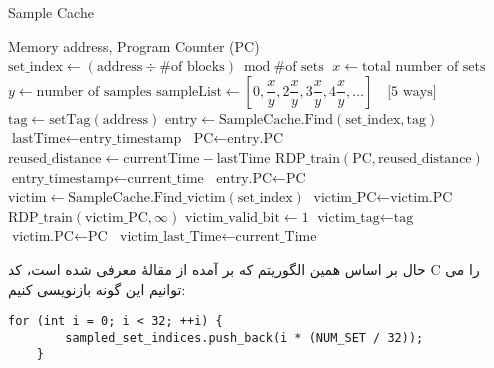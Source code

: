 \documentclass[17pt]{article}
\begin{document}
\begin{latin}
\begin{algorithm}
\caption{Sample Cache}\label{alg:sca}
\begin{algorithmic}[1]
\Require Memory address, Program Counter (PC)
\Statex
{}
    \State $\text{set\_index} \gets (\text{address} \div \text{\# of blocks}) \bmod \text{\# of sets}$
    \State $x \gets \text{total number of sets}$
    \State $y \gets \text{number of samples}$
    \State $\text{sampleList} \gets [0, \dfrac{x}{y}, 2\dfrac{x}{y}, 3\dfrac{x}{y}, 4\dfrac{x}{y}, \dots] \quad \text{[5 ways]}$
    \Statex
        \State $\text{tag} \gets \text{setTag}(\text{address})$
        \State $\text{entry} \gets \text{SampleCache.Find}(\text{set\_index}, \text{tag})$
            \State $\text{lastTime} \gets \text{entry\_timestamp}$
            \State $\text{PC} \gets \text{entry.PC}$
            \State $\text{reused\_distance} \gets \text{currentTime} - \text{lastTime}$
            \State $\text{RDP\_train}(\text{PC}, \text{reused\_distance})$
            \State $\text{entry\_timestamp} \gets \text{current\_time}$
            \State $\text{entry.PC} \gets \text{PC}$
        \Else
            \State $\text{victim} \gets \text{SampleCache.Find\_victim}(\text{set\_index})$
            \State $\text{victim\_PC} \gets \text{victim.PC}$
            \State $\text{RDP\_train}(\text{victim\_PC}, \infty)$ 
            \State $\text{victim\_valid\_bit} \gets 1$
            \State $\text{victim\_tag} \gets \text{tag}$
            \State $\text{victim.PC} \gets \text{PC}$
            \State $\text{victim\_last\_Time} \gets \text{current\_Time}$
        \EndIf
    \EndIf
\EndFunction
\end{algorithmic}
\end{algorithm}
\end{latin}

\newpage
حال بر اساس همین الگوریتم که بر آمده از مقالهٔ معرفی شده است، کد C را می توانیم این گونه بازنویسی کنیم:

\begin{LTR}
\begin{lstlisting}
for (int i = 0; i < 32; ++i) {
        sampled_set_indices.push_back(i * (NUM_SET / 32));
    }
\end{lstlisting}
\end{LTR}
    
\end{document}
